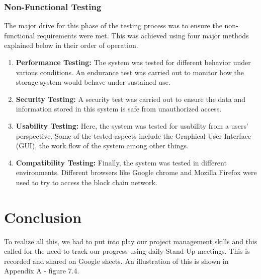 \subsubsection{Non-Functional Testing}
The major drive for this phase of the testing process was to ensure the non-functional requirements were met. This was achieved using four major methods explained below in their order of operation.
\begin{enumerate}
\item \textbf{Performance Testing:} The system was tested for different behavior under various conditions. An endurance test was carried out to monitor how the storage system would behave under sustained use.
\item \textbf{Security Testing:} A security test was carried out to ensure the data and information stored in this system is safe from unauthorized access.
\item \textbf{Usability Testing:} Here, the system was tested for usability from a users' perspective. Some of the tested aspects include the Graphical User Interface (GUI), the work flow of the system among other things.
\item \textbf{Compatibility Testing:} Finally, the system was tested in different environments. Different browsers like Google chrome and Mozilla Firefox were used to try to access the block chain network.
\end{enumerate}

\section{Conclusion}
To realize all this, we had to put into play our project management skills and this called for the need to track our progress using daily Stand Up meetings. This is recorded and shared on Google sheets. An illustration of this is shown in Appendix A - figure 7.4.


